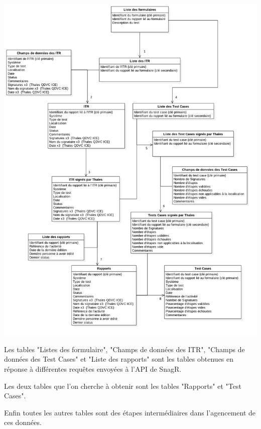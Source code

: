 \newpage
\begin{center}
\includegraphics[scale=0.5]{ressources/images/figures/bd.png}
\end{center}
\newpage

Les tables "Listes des formulaire", "Champs de données des ITR", "Champs de données des Test Cases" et "Liste des rapports" sont les tables obtenues en réponse à différentes requêtes envoyées à l'\gls{API} de \gls{SnagR}. 

Les deux tables que l'on cherche à obtenir sont les tables "Rapports" et "Test Cases".

Enfin toutes les autres tables sont des étapes intermédiaires dans l'agencement de ces données.

